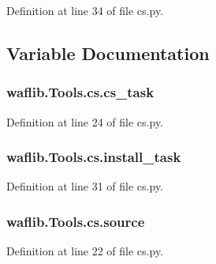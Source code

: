 Definition at line 34 of file cs.\+py.



\subsection{Variable Documentation}
\subsubsection[{\texorpdfstring{cs\+\_\+task}{cs_task}}]{\setlength{\rightskip}{0pt plus 5cm}waflib.\+Tools.\+cs.\+cs\+\_\+task}\hypertarget{namespacewaflib_1_1_tools_1_1cs_af7f8d87328d0d0065b91b77818611026}{}\label{namespacewaflib_1_1_tools_1_1cs_af7f8d87328d0d0065b91b77818611026}


Definition at line 24 of file cs.\+py.

\subsubsection[{\texorpdfstring{install\+\_\+task}{install_task}}]{\setlength{\rightskip}{0pt plus 5cm}waflib.\+Tools.\+cs.\+install\+\_\+task}\hypertarget{namespacewaflib_1_1_tools_1_1cs_a137a86a8fdff7deb27d1ddb94eebdec3}{}\label{namespacewaflib_1_1_tools_1_1cs_a137a86a8fdff7deb27d1ddb94eebdec3}


Definition at line 31 of file cs.\+py.

\subsubsection[{\texorpdfstring{source}{source}}]{\setlength{\rightskip}{0pt plus 5cm}waflib.\+Tools.\+cs.\+source}\hypertarget{namespacewaflib_1_1_tools_1_1cs_a60fa7099590d96535f62426c3de2b7bd}{}\label{namespacewaflib_1_1_tools_1_1cs_a60fa7099590d96535f62426c3de2b7bd}


Definition at line 22 of file cs.\+py.

